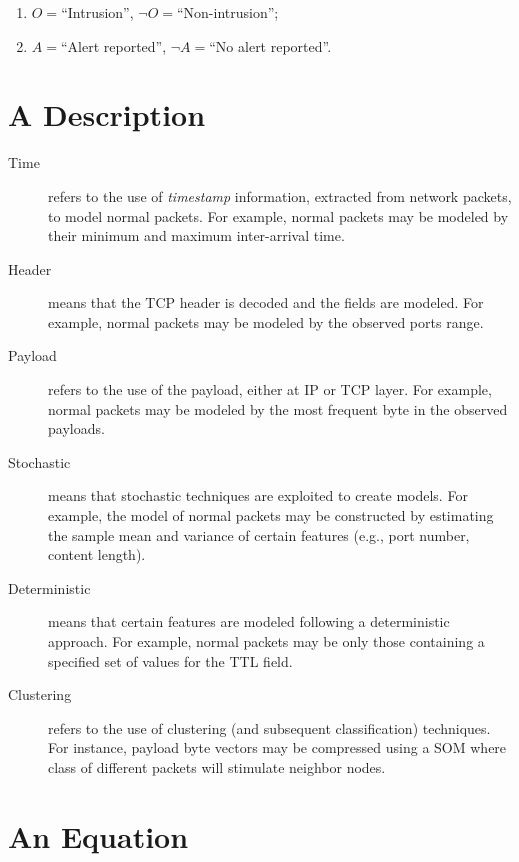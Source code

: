 \begin{enumerate}
\item $O = $``Intrusion'', $\neg O =$``Non-intrusion'';
\item $A = $``Alert reported'', $\neg A =$``No alert reported''.
\end{enumerate}


\section{A Description}

\begin{description}
\item[Time] refers to the use of \emph{timestamp} information, extracted from network packets, to model normal packets. For example, normal packets may be modeled by their minimum and maximum inter-arrival time.
\item[Header] means that the \ac{TCP} header is decoded and the fields are modeled. For example, normal packets may be modeled by the observed ports range.
\item[Payload] refers to the use of the payload, either at
\ac{IP} or \ac{TCP} layer. For example, normal packets may be modeled by the most frequent byte in the observed payloads.
\item[Stochastic] means that stochastic techniques are exploited to create models. For example, the model of normal packets may be constructed by estimating the sample mean and variance of certain features (e.g., port number, content length).
\item[Deterministic] means that certain features are modeled following a deterministic approach. For example, normal packets may be only those containing a specified set of values for the \ac{TTL} field.
\item[Clustering] refers to the use of clustering (and subsequent classification) techniques. For instance, payload byte vectors may be compressed using a \ac{SOM} where class of different packets will stimulate neighbor nodes.
\end{description}


\section{An Equation}

